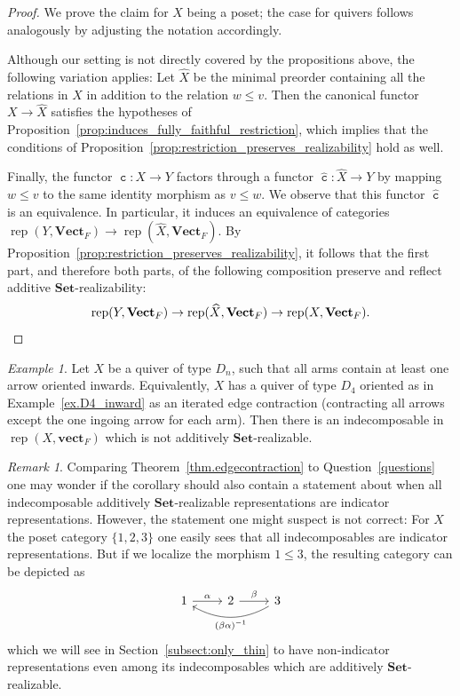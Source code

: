 \documentclass[a4paper]{amsart}
\theoremstyle{plain}
\theoremstyle{definition}
\theoremstyle{remark}
\newtheorem{example}[theorem]{Example}
\newtheorem{remark}[theorem]{Remark}
\newcommand{\funct}[1]{\operatorname{\mathtt{#1}}}
\newcommand{\Set}{\mathbf{Set}}
\newcommand{\VectF}{\mathbf{Vect}_F}
\newcommand{\vectF}{\mathbf{vect}_F}
\DeclareMathOperator{\rep}{rep}
\begin{document}
\begin{proof}
We prove the claim for \( X \) being a poset; the case for quivers follows analogously by adjusting the notation accordingly.

Although our setting is not directly covered by the propositions above, the following variation applies: Let \( \widehat{X} \) be the minimal preorder containing all the relations in \( X \) in addition to the relation \( w \leq v \). Then the canonical functor \( X \to \widehat{X} \) satisfies the hypotheses of Proposition~\ref{prop:induces_fully_faithful_restriction}, which implies that the conditions of Proposition~\ref{prop:restriction_preserves_realizability} hold as well. 

Finally, the functor $\funct{c}\colon X\to Y$ factors through a functor $\hat{\funct{c}}\colon \widehat{X}\to Y$ by mapping $w\leq v$ to the same identity morphism as $v\leq w$. We observe that this functor \( \hat{\funct{c}} \) is an equivalence. In particular, it induces an equivalence of categories $\rep(Y, \VectF) \to \rep(\widehat{X}, \VectF)$. By Proposition~\ref{prop:restriction_preserves_realizability}, it follows that the first part, and therefore both parts, of the following composition preserve and reflect additive $\Set$-realizability:
\[\rep(Y, \VectF) \to \rep(\widehat{X}, \VectF) \to \rep(X, \VectF). \qedhere \]
\end{proof}

\begin{example} \label{example:D_n_not_realizable}
Let \( X \) be a quiver of type \( D_n \), such that all arms contain at least one arrow oriented inwards. Equivalently, \( X \) has a quiver of type \( D_4 \) oriented as in Example~\ref{ex.D4_inward} as an iterated edge contraction (contracting all arrows except the one ingoing arrow for each arm). Then there is an indecomposable in \( \rep(X, \vectF) \) which is not additively \( \Set \)-realizable.
\end{example}

\begin{remark}
Comparing Theorem~\ref{thm.edgecontraction} to Question~\ref{questions} one may wonder if the corollary should also contain a statement about when all indecomposable additively \( \Set \)-realizable representations are indicator representations. However, the statement one might suspect is not correct: For \( X \) the poset category \( \{ 1, 2, 3 \} \) one easily sees that all indecomposables are indicator representations. But if we localize the morphism \( 1 \leq 3 \), the resulting category can be depicted as
\[ \begin{tikzcd}
1 \ar[r,"\alpha"] & 2 \ar[r,"\beta"] & 3 \ar[ll,bend left,"(\beta \alpha)^{-1}"]
\end{tikzcd} \]
which we will see in Section~\ref{subsect:only_thin} to have non-indicator representations even among its indecomposables which are additively \( \Set \)-realizable. 
\end{remark}
\end{document}
